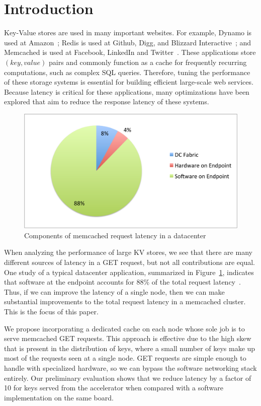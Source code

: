 \section{Introduction}

Key-Value stores are used in many important websites. For example, Dynamo is
used at Amazon~\cite{dynamo}; Redis is used at Github, Digg, and Blizzard
Interactive~\cite{Reddi10}; and Memcached is used at Facebook, LinkedIn and
Twitter~\cite{memcached, Petrovic08}. These applications store $(key, value)$
pairs and commonly function as a cache for frequently recurring computations,
such as complex SQL queries. Therefore, tuning the performance of these storage
systems is essential for building efficient large-scale web services. Because
latency is critical for these applications, many optimizations have been
explored that aim to reduce the response latency of these systems. 

\begin{figure}[b]
\begin{center}
\includegraphics[width=\linewidth]{softwarelag.pdf}
\caption{Components of memcached request latency in a datacenter}
\label{fig:lag}
\end{center}
\end{figure}

When analyzing the performance of large KV stores, we see that there are many
different sources of latency in a GET request, but not all contributions are
equal. One study of a typical datacenter application, summarized in
Figure~\ref{fig:lag}, indicates that software at the endpoint accounts for
$88\%$ of the total request latency~\cite{Kapoor2012}.  Thus, if we can improve
the latency of a single node, then we can make substantial improvements to the
total request latency in a memcached cluster. This is the focus of this paper.

We propose incorporating a dedicated cache on each node whose sole job is to
serve memcached GET requests. This approach is effective due to the high skew
that is present in the distribution of keys, where a small number of keys make
up most of the requests seen at a single node. GET requests are simple enough
to handle with specialized hardware, so we can bypass the software networking
stack entirely. Our preliminary evaluation shows that we reduce latency by a
factor of 10 for keys served from the accelerator when compared with a software
implementation on the same board.
